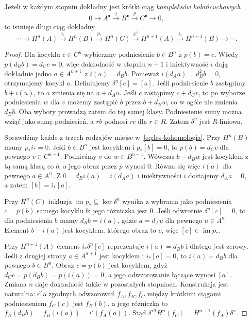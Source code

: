 \begin{twierdzenie}
\label{thm:les-kohomologia}
Jeżeli w każdym stopniu dokładny jest
krótki ciąg \emph{kompleksów kołańcuchowych}
\[
 0\longrightarrow A^\bullet\xrightarrow{i}B^\bullet
 \xrightarrow{p}C^\bullet\longrightarrow0,
\]
to istnieje długi ciąg dokładny
\begin{equation}\label{eq:les-kohomologia}
 \cdots\longrightarrow H^n(A)
 \xrightarrow{i_*}H^n(B)
 \xrightarrow{p_*}H^n(C)
 \xrightarrow{\delta^n}H^{n+1}(A)
 \xrightarrow{i_*}H^{n+1}(B)\longrightarrow\cdots.
\end{equation}
\end{twierdzenie}
\begin{proof}
Dla kocyklu $c\in C^n$ wybierzmy podniesienie
$b\in B^n$ z $p(b)=c$.
Wtedy $p(d_Bb)=d_Cc=0$, więc dokładność
w stopniu $n+1$ i iniektywność $i$
dają dokładnie jedno $a\in A^{n+1}$
z $i(a)=d_Bb$.
Ponieważ $i(d_Aa)=d_B^2b=0$,
otrzymujemy kocykl $a$.
Definiujemy $\delta^n[c]=[a]$.
Jeśli podniesienie $b$ zastąpimy $b+i(u)$,
to $a$ zmienia się na $a+d_Au$.
Jeśli $c$ zastąpimy $c+d_Cv$, to po
wyborze podniesienia $w$ dla $v$ możemy
zastąpić $b$ przez $b+d_Bw$,
co w ogóle nie zmienia $d_Bb$.
Oba wybory prowadzą zatem do tej
samej klasy. Podniesienie sumy można wziąć
jako sumę podniesień, a $rb$ podnosi $rc$ dla $r\in R$.
Zatem $\delta^n$ jest $R$-liniowa.

Sprawdźmy każde z trzech rodzajów miejsc
w~\eqref{eq:les-kohomologia}.
Przy $H^n(B)$ mamy $p_*i_*=0$.
Jeśli $b\in B^n$ jest kocyklem
i $p_*[b]=0$, to $p(b)=d_Cv$
dla pewnego $v\in C^{n-1}$.
Podnieśmy $v$ do $w\in B^{n-1}$.
Wówczas $b-d_Bw$ jest kocyklem
z tą samą klasą co $b$, a jego
obraz przez $p$ wynosi $0$.
Równa się więc $i(a)$ dla pewnego
$a\in A^n$. Z $0=d_Bi(a)=i(d_Aa)$
i iniektywności $i$ dostajemy
$d_Aa=0$, a zatem $[b]=i_*[a]$.

Przy $H^n(C)$ inkluzja
$\operatorname{im}p_*\subseteq\ker\delta^n$
wynika z wybrania jako podniesienia $c=p(b)$
samego kocyklu $b$: jego różniczka jest $0$.
Jeśli odwrotnie $\delta^n[c]=0$,
to dla podniesienia $b$ mamy $d_Bb=i(a)$,
gdzie $a=d_Au$ dla pewnego $u\in A^n$.
Element $b-i(u)$ jest kocyklem,
którego obraz to $c$, więc
$[c]\in\operatorname{im}p_*$.

Przy $H^{n+1}(A)$ element
$i_*\delta^n[c]$ reprezentuje
$i(a)=d_Bb$ i dlatego jest zerowy.
Jeśli z drugiej strony $a\in A^{n+1}$
jest kocyklem i $i_*[a]=0$,
to $i(a)=d_Bb$ dla pewnego
$b\in B^n$. Obraz $c=p(b)$ jest
kocyklem, gdyż $d_Cc=p(d_Bb)=p(i(a))=0$,
a jego odwzorowanie łączące wynosi $[a]$.
Zmiana $n$ daje dokładność także
w pozostałych stopniach. Konstrukcja jest naturalna:
dla zgodnych odwzorowań $f_A,f_B,f_C$ między krótkimi ciągami
podniesieniem $f_C(c)$ jest $f_B(b)$, a jego różniczka to
$f_B(d_Bb)=f_B(i(a))=i'(f_A(a))$.
Stąd $\delta'^n H^n(f_C)=H^{n+1}(f_A)\delta^n$.
\end{proof}

